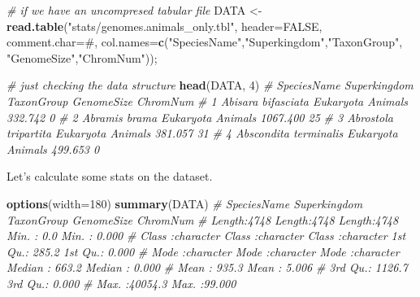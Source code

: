 \documentclass[10pt,a4paper,]{article}
\newenvironment{Shaded}{}{}
\newcommand{\CommentTok}[1]{\textcolor[rgb]{0.38,0.63,0.69}{\textit{#1}}}
\newcommand{\DataTypeTok}[1]{\textcolor[rgb]{0.56,0.13,0.00}{#1}}
\newcommand{\DecValTok}[1]{\textcolor[rgb]{0.25,0.63,0.44}{#1}}
\newcommand{\KeywordTok}[1]{\textcolor[rgb]{0.00,0.44,0.13}{\textbf{#1}}}
\newcommand{\NormalTok}[1]{#1}
\newcommand{\OtherTok}[1]{\textcolor[rgb]{0.00,0.44,0.13}{#1}}
\newcommand{\StringTok}[1]{\textcolor[rgb]{0.25,0.44,0.63}{#1}}
\begin{document}
\begin{Shaded}
\begin{Highlighting}[]
\CommentTok{\# if we have an uncompresed tabular file}
\NormalTok{DATA \textless{}{-}}\StringTok{ }\KeywordTok{read.table}\NormalTok{(}\StringTok{"stats/genomes.animals\_only.tbl"}\NormalTok{,}
                    \DataTypeTok{header=}\OtherTok{FALSE}\NormalTok{, }\DataTypeTok{comment.char=}\StringTok{\textquotesingle{}\#\textquotesingle{}}\NormalTok{,}
                    \DataTypeTok{col.names=}\KeywordTok{c}\NormalTok{(}\StringTok{"SpeciesName"}\NormalTok{,}\StringTok{"Superkingdom"}\NormalTok{,}\StringTok{"TaxonGroup"}\NormalTok{,}
                                \StringTok{"GenomeSize"}\NormalTok{,}\StringTok{"ChromNum"}\NormalTok{));}

\CommentTok{\# just checking the data structure}
\KeywordTok{head}\NormalTok{(DATA, }\DecValTok{4}\NormalTok{)}
\CommentTok{\#             SpeciesName Superkingdom TaxonGroup GenomeSize ChromNum}
\CommentTok{\# 1    Abisara bifasciata    Eukaryota    Animals    332.742        0}
\CommentTok{\# 2         Abramis brama    Eukaryota    Animals   1067.400       25}
\CommentTok{\# 3  Abrostola tripartita    Eukaryota    Animals    381.057       31}
\CommentTok{\# 4 Abscondita terminalis    Eukaryota    Animals    499.653        0}
\end{Highlighting}
\end{Shaded}

Let's calculate some stats on the dataset.

\begin{Shaded}
\begin{Highlighting}[]
\KeywordTok{options}\NormalTok{(}\DataTypeTok{width=}\DecValTok{180}\NormalTok{)}
\KeywordTok{summary}\NormalTok{(DATA)}
\CommentTok{\#  SpeciesName        Superkingdom        TaxonGroup          GenomeSize         ChromNum}
\CommentTok{\#  Length:4748        Length:4748        Length:4748        Min.   :    0.0   Min.   : 0.000}
\CommentTok{\#  Class :character   Class :character   Class :character   1st Qu.:  285.2   1st Qu.: 0.000}
\CommentTok{\#  Mode  :character   Mode  :character   Mode  :character   Median :  663.2   Median : 0.000}
\CommentTok{\#                                                           Mean   :  935.3   Mean   : 5.006}
\CommentTok{\#                                                           3rd Qu.: 1126.7   3rd Qu.: 0.000}
\CommentTok{\#                                                           Max.   :40054.3   Max.   :99.000}
\end{Highlighting}
\end{Shaded}
\end{document}
